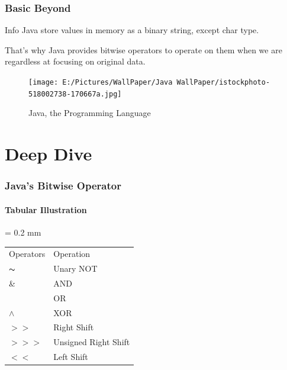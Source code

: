 \documentclass[table, compress]{beamer}
\begin{document}
\begin{frame}
    \frametitle{Basic Beyond}
    \begin{block}{Info}
    	Java store values in memory as a binary string, except char type.
    \end{block}
    
    That's why Java provides bitwise operators to operate on them when we are regardless at focusing on original data.
   
\end{frame}


\begin{frame}
    \begin{figure}[!h]
    \centering
    	\texttt{[image: E:/Pictures/WallPaper/Java WallPaper/istockphoto-518002738-170667a.jpg]}
    \caption{Java, the Programming Language}
    \end{figure}
    
   
\end{frame}


\section{Deep Dive}


\begin{frame}
    \frametitle{Java's Bitwise Operator}
    \framesubtitle{Tabular Illustration}
    
\begin{center}
\columnseprule = 0.2 mm
	\begin{longtable}{|| m{5 em} || m{10 em} ||}
		\hline\hline
		\rowcolor{teal!20}
		\multicolumn{2}{c}{\textbf{\textsf{\textcolor{black}{Bitwise Operators}}}}\\
		\hline\hline
		 Operators & Operation\\
		 $\thicksim$ & Unary NOT\\
		 \& & AND\\
 		 \textbf{\textbar} & OR\\
		 $\wedge$ & XOR\\
		 $>>$ & Right Shift\\
		 $>>>$ & Unsigned Right Shift\\
		 $<<$ & Left Shift\\
		\hline\hline
	\end{longtable}
\end{center}

\end{frame}
\end{document}
